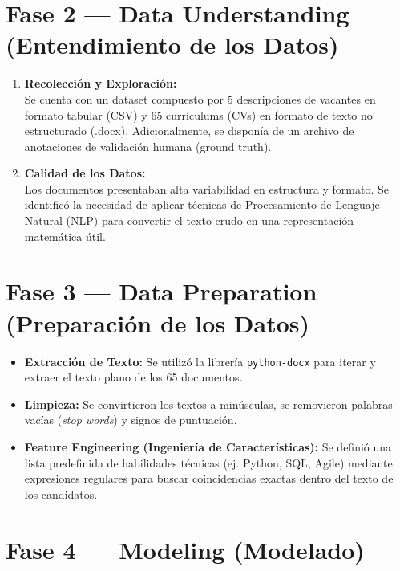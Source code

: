 \documentclass[11pt]{article}
\begin{document}
\section*{Fase 2 — Data Understanding (Entendimiento de los Datos)}

\begin{enumerate}[label=\textbf{\arabic*.}]
    \item \textbf{Recolección y Exploración:} \\
    Se cuenta con un dataset compuesto por 5 descripciones de vacantes en formato tabular (CSV) y 65 currículums (CVs) en formato de texto no estructurado (.docx). Adicionalmente, se disponía de un archivo de anotaciones de validación humana (ground truth).
    
    \item \textbf{Calidad de los Datos:} \\
    Los documentos presentaban alta variabilidad en estructura y formato. Se identificó la necesidad de aplicar técnicas de Procesamiento de Lenguaje Natural (NLP) para convertir el texto crudo en una representación matemática útil.
\end{enumerate}

\section*{Fase 3 — Data Preparation (Preparación de los Datos)}

\begin{itemize}
    \item \textbf{Extracción de Texto:} Se utilizó la librería \texttt{python-docx} para iterar y extraer el texto plano de los 65 documentos.
    \item \textbf{Limpieza:} Se convirtieron los textos a minúsculas, se removieron palabras vacías (\textit{stop words}) y signos de puntuación.
    \item \textbf{Feature Engineering (Ingeniería de Características):} Se definió una lista predefinida de habilidades técnicas (ej. Python, SQL, Agile) mediante expresiones regulares para buscar coincidencias exactas dentro del texto de los candidatos.
\end{itemize}

\section*{Fase 4 — Modeling (Modelado)}
\end{document}
